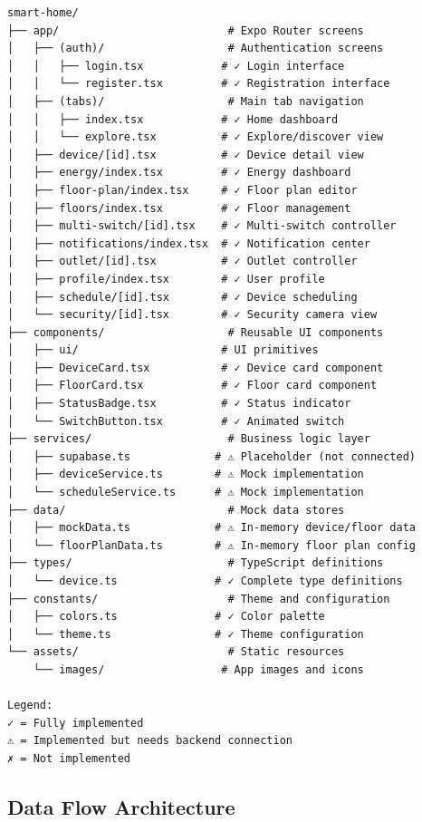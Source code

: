 \documentclass[12pt,a4paper]{article}
\begin{document}
\begin{verbatim}
smart-home/
├── app/                          # Expo Router screens
│   ├── (auth)/                   # Authentication screens
│   │   ├── login.tsx            # ✓ Login interface
│   │   └── register.tsx         # ✓ Registration interface
│   ├── (tabs)/                   # Main tab navigation
│   │   ├── index.tsx            # ✓ Home dashboard
│   │   └── explore.tsx          # ✓ Explore/discover view
│   ├── device/[id].tsx          # ✓ Device detail view
│   ├── energy/index.tsx         # ✓ Energy dashboard
│   ├── floor-plan/index.tsx     # ✓ Floor plan editor
│   ├── floors/index.tsx         # ✓ Floor management
│   ├── multi-switch/[id].tsx    # ✓ Multi-switch controller
│   ├── notifications/index.tsx  # ✓ Notification center
│   ├── outlet/[id].tsx          # ✓ Outlet controller
│   ├── profile/index.tsx        # ✓ User profile
│   ├── schedule/[id].tsx        # ✓ Device scheduling
│   └── security/[id].tsx        # ✓ Security camera view
├── components/                   # Reusable UI components
│   ├── ui/                      # UI primitives
│   ├── DeviceCard.tsx           # ✓ Device card component
│   ├── FloorCard.tsx            # ✓ Floor card component
│   ├── StatusBadge.tsx          # ✓ Status indicator
│   └── SwitchButton.tsx         # ✓ Animated switch
├── services/                     # Business logic layer
│   ├── supabase.ts             # ⚠ Placeholder (not connected)
│   ├── deviceService.ts        # ⚠ Mock implementation
│   └── scheduleService.ts      # ⚠ Mock implementation
├── data/                         # Mock data stores
│   ├── mockData.ts             # ⚠ In-memory device/floor data
│   └── floorPlanData.ts        # ⚠ In-memory floor plan config
├── types/                        # TypeScript definitions
│   └── device.ts               # ✓ Complete type definitions
├── constants/                    # Theme and configuration
│   ├── colors.ts               # ✓ Color palette
│   └── theme.ts                # ✓ Theme configuration
└── assets/                       # Static resources
    └── images/                  # App images and icons

Legend:
✓ = Fully implemented
⚠ = Implemented but needs backend connection
✗ = Not implemented
\end{verbatim}


\subsection{Data Flow Architecture}
\end{document}
